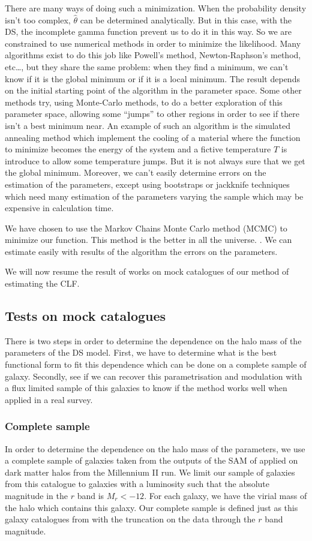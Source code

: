 There are many ways of doing such a minimization. When the probability density
isn't too complex, $\hat{\theta}$ can be determined analytically. But in this
case, with the DS, the incomplete gamma function prevent us to do it in this
way. So we are constrained to use numerical methods in order to minimize the
likelihood. Many algorithms exist to do this job like Powell's method,
Newton-Raphson's method, etc\ldots, but they share the same problem: when they
find a minimum, we can't know if it is the global minimum or if it is a local
minimum. The result depends on the initial starting point of the algorithm in
the parameter space. Some other methods try, using Monte-Carlo methods, to do a
better exploration of this parameter space, allowing some ``jumps'' to other
regions in order to see if there isn't a best minimum near. An example of such
an algorithm is the simulated annealing method which implement the cooling of a
material where the function to minimize becomes the energy of the system and a
fictive temperature $T$ is introduce to allow some temperature jumps. But it is
not always sure that we get the global minimum. Moreover, we can't easily
determine errors on the estimation of the parameters, except using bootstraps
or jackknife techniques which need many estimation of the parameters varying
the sample which may be expensive in calculation time.

We have chosen to use the Markov Chains Monte Carlo method (MCMC) to minimize
our function. This method is the better in all the universe. . We can estimate easily with results of the algorithm the errors on the
parameters.

We will now resume the result of works on mock catalogues of our method of
estimating the CLF\@.
%
\subsection{Tests on mock catalogues}
%
There is two steps in order to determine the dependence on the halo mass of the
parameters of the DS model. First, we have to determine what is the best
functional form to fit this dependence which can be done on a complete sample
of galaxy. Secondly, see if we can recover this parametrisation and modulation
with a flux limited sample of this galaxies to know if the method works well
when applied in a real survey.
%
\subsubsection{Complete sample}
%
In order to determine the dependence on the halo mass of the parameters, we use
a complete sample of galaxies taken from the outputs of the SAM of
\citet{Guo+11} applied on dark matter halos from the Millennium II run. We
limit our sample of galaxies from this catalogue to galaxies with a luminosity
such that the absolute magnitude in the $r$ band is $M_r<-12$. For each galaxy,
we have the virial mass of the halo which contains this galaxy. Our complete
sample is defined just as this galaxy catalogues from \citet{Guo+11} with the
truncation on the data through the $r$ band magnitude.

